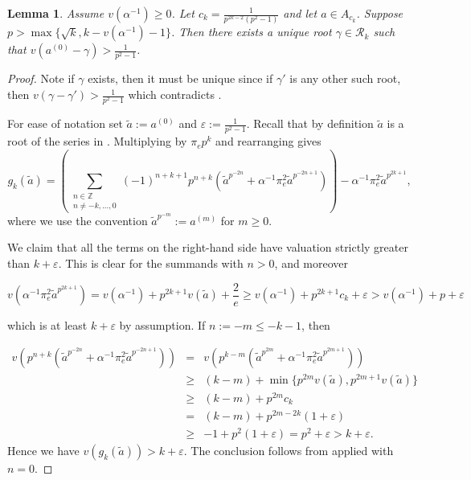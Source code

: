 \documentclass{amsart}
\newtheorem{lemma}[theorem]{Lemma}
\theoremstyle{definition}
\numberwithin{theorem}{section}
\numberwithin{equation}{section}
\begin{document}
\begin{lemma}\label{lemma: unique root at level k}
Assume $v(\alpha^{-1}) \geq 0$. Let $c_k=\frac{1}{p^{2k-2}(p^2-1)}$ and let $a \in A_{c_k}$. Suppose $p > \max\{\sqrt{k}, k-v(\alpha^{-1}) -1\}$. 
Then there exists a unique root $\gamma \in \mathcal{R}_k$ such that $v(a^{(0)} - \gamma) > \frac{1}{p^2-1}$.
\end{lemma}

\begin{proof}
Note if $\gamma$ exists, then it must be unique since if $\gamma'$ is any other such root, then $v(\gamma-\gamma') > \frac{1}{p^2-1}$ which contradicts .

For ease of notation set $\tilde{a}:=a^{(0)}$ and $\varepsilon := \frac{1}{p^2-1}$. Recall that by definition $\tilde{a}$ is a root of the series in . Multiplying  by $\pi_ep^k$ and rearranging gives
\[
g_k(\tilde{a}) = 
        \left( \sum_{\substack{n \in \mathbb{Z} \\ n \neq -k,...,0}} (-1)^{n+k+1} p^{n+k}\left(  \tilde{a}^{p^{-2n}} + \alpha^{-1} \pi_e^2 {\tilde{a}}^{p^{-2n+1}} \right) \right) - \alpha^{-1}\pi_e^2 \tilde{a}^{p^{2k+1}},
\]
where we use the convention $\tilde{a}^{p^{-m}} := a^{(m)}$ for $m \geq 0$.

We claim that all the terms on the right-hand side have valuation strictly greater than $k+\varepsilon$. This is clear for the summands with $n>0$, and moreover 

\begin{equation*}
    v(\alpha^{-1}\pi_e^2\tilde{a}^{p^{2k+1}}) = v(\alpha^{-1}) + p^{2k+1}v(\tilde{a}) + \frac{2}{e} \geq v(\alpha^{-1}) +  p^{2k+1}c_k + \varepsilon > v(\alpha^{-1}) + p + \varepsilon
\end{equation*}

which is at least $k+\varepsilon$ by assumption.
If $n:=-m \leq -k-1$, then

\begin{eqnarray*}
    v \left(p^{n+k}\left(\tilde{a}^{p^{-2n}}+\alpha^{-1}\pi_e^2\tilde{a}^{p^{-2n+1}} \right) \right) &=& v \left(p^{k-m}\left(\tilde{a}^{p^{2m}}+\alpha^{-1}\pi_e^2\tilde{a}^{p^{2m+1}} \right) \right) \\
    &\geq& (k-m) + \min\{p^{2m}v(\tilde{a}),p^{2m+1}v(\tilde{a})\} \\
    &\geq& (k-m) + p^{2m}c_k \\
    &=& (k-m) + p^{2m-2k}(1 + \varepsilon) \\
    &\geq& -1 + p^2(1 + \varepsilon) = p^2 + \varepsilon > k + \varepsilon.
\end{eqnarray*}
Hence we have $v(g_k(\tilde{a})) > k+\varepsilon$. The conclusion follows from  applied with $n=0$. 
\end{proof}
\end{document}
